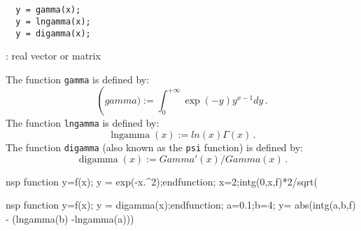 \begin{mandesc}
  \\
  \\
\end{mandesc}
\begin{calling_sequence}
\begin{verbatim}
  y = gamma(x);
  y = lngamma(x);  
  y = digamma(x);  
\end{verbatim}
\end{calling_sequence}
\begin{parameters}
  \begin{varlist}
    : real vector or matrix
  \end{varlist}
\end{parameters}

\begin{mandescription}
  The function \verb+gamma+ is defined by: 
  \[
  \operatorname(gamma) := \int_0^{+\infty} \exp(-y)y^{x-1} dy \,.
  \]
  The function \verb+lngamma+ is defined by:
  \[
  \operatorname{lngamma}(x) := ln(x)\Gamma(x) \,.
  \]
  The function \verb+digamma+ (also known as the \verb+psi+ function) 
  is defined by:
  \[
  \operatorname{digamma}(x) := Gamma'(x)/Gamma(x)\,.
  \]  
\end{mandescription}
\begin{examples}
\begin{mintednsp}{nsp}
  function y=f(x); y = exp(-x.^2);endfunction;
  x=2;intg(0,x,f)*2/sqrt(%
\end{mintednsp}

\begin{mintednsp}{nsp}
function y=f(x); y = digamma(x);endfunction;
a=0.1;b=4;
y= abs(intg(a,b,f) - (lngamma(b) -lngamma(a)))
\end{mintednsp}

\end{examples}

